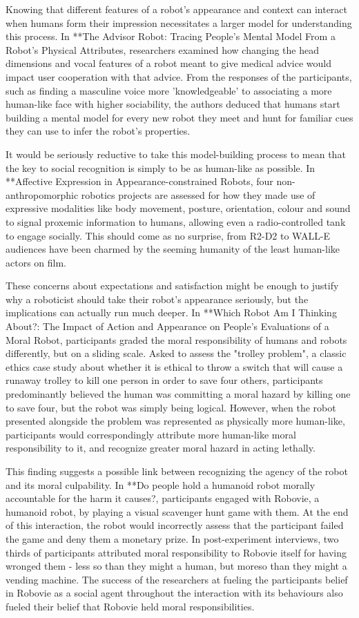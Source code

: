 \documentclass{sfuthesis}
\begin{document}
Knowing that different features of a robot's appearance and context can interact when humans form their impression necessitates a larger model for understanding this process. In **The Advisor Robot: Tracing People's Mental Model From a Robot's Physical Attributes, researchers examined how changing the head dimensions and vocal features of a robot meant to give medical advice would impact user cooperation with that advice. From the responses of the participants, such as finding a masculine voice more 'knowledgeable' to associating a more human-like face with higher sociability, the authors deduced that humans start building a mental model for every new robot they meet and hunt for familiar cues they can use to infer the robot's properties.

It would be seriously reductive to take this model-building process to mean that the key to social recognition is simply to be as human-like as possible. In **Affective Expression in Appearance-constrained Robots, four non-anthropomorphic robotics projects are assessed for how they made use of expressive modalities like body movement, posture, orientation, colour and sound to signal proxemic information to humans, allowing even a radio-controlled tank to engage socially. This should come as no surprise, from R2-D2 to WALL-E audiences have been charmed by the seeming humanity of the least human-like actors on film.

These concerns about expectations and satisfaction might be enough to justify why a roboticist should take their robot's appearance seriously, but the implications can actually run much deeper. In **Which Robot Am I Thinking About?: The Impact of Action and Appearance on People's Evaluations of a Moral Robot, participants graded the moral responsibility of humans and robots differently, but on a sliding scale. Asked to assess the "trolley problem", a classic ethics case study about whether it is ethical to throw a switch that will cause a runaway trolley to kill one person in order to save four others, participants predominantly believed the human was committing a moral hazard by killing one to save four, but the robot was simply being logical. However, when the robot presented alongside the problem was represented as physically more human-like, participants would correspondingly attribute more human-like moral responsibility to it, and recognize greater moral hazard in acting lethally.

This finding suggests a possible link between recognizing the agency of the robot and its moral culpability. In **Do people hold a humanoid robot morally accountable for the harm it causes?, participants engaged with Robovie, a humanoid robot, by playing a visual scavenger hunt game with them. At the end of this interaction, the robot would incorrectly assess that the participant failed the game and deny them a monetary prize. In post-experiment interviews, two thirds of participants attributed moral responsibility to Robovie itself for having wronged them - less so than they might a human, but moreso than they might a vending machine. The success of the researchers at fueling the participants belief in Robovie as a social agent throughout the interaction with its behaviours also fueled their belief that Robovie held moral responsibilities.
\end{document}
